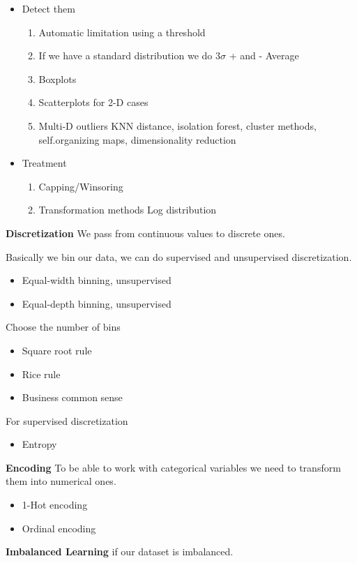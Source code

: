 \begin{itemize}
    \item Detect them
    \begin{enumerate}
        \item Automatic limitation using a threshold
        \item If we have a standard distribution we do $3\sigma$ + and - Average
        \item Boxplots
        \item Scatterplots for 2-D cases
        \item Multi-D outliers \ra KNN distance, isolation forest, cluster methods, self.organizing maps, dimensionality reduction 
    \end{enumerate}

    \item Treatment
    \begin{enumerate}
        \item Capping/Winsoring
        \item Transformation methods \ra Log distribution
    \end{enumerate}

\end{itemize}


\textbf{Discretization} \ra We pass from continuous values to discrete ones. 

\vspace{10pt}

Basically we bin our data, we can do supervised and unsupervised discretization.

\begin{itemize}
    \item Equal-width binning, unsupervised
    \item Equal-depth binning, unsupervised
\end{itemize}

Choose the number of bins

\begin{itemize}
    \item Square root rule
    \item Rice rule
    \item Business common sense 
\end{itemize}

For supervised discretization
\begin{itemize}
    \item Entropy
\end{itemize}

\textbf{Encoding} \ra To be able to work with categorical variables we need to transform them into numerical ones.

\begin{itemize}
    \item 1-Hot encoding
    \item Ordinal encoding
\end{itemize}

\textbf{Imbalanced Learning} \ra if our dataset is imbalanced.
